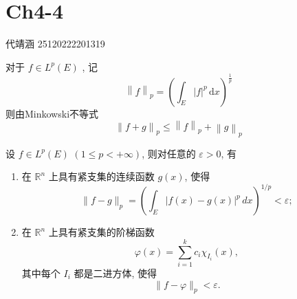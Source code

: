 \documentclass[../main.tex]{subfiles}
\begin{document}
\ifSubfilesClassLoaded{

    
    \setcounter{chapter}{3}
}{}

\chapter{ Ch4-4 }
代靖涵 25120222201319

\begin{definition}{}{}
对于 \(  f \in L^{p}\left( E \right)   \) , 记 \[
\left\| f \right\|_{p}= \left( \int_{E}\left| f \right|  ^{p}\,\mathrm{d} x\right)^{\frac{1}{p}} 
\]则由Minkowski不等式 \[
\left\| f+ g \right\|_{p}\le \left\| f \right\|_{p}+ \left\| g \right\|_{p}
\]
\end{definition}
\begin{lemma}{}{}
设 $f \in L^{p}(E)$ $(1 \le p < +\infty)$, 则对任意的 $\varepsilon > 0$, 有
\begin{enumerate}
\item 在 $\mathbb{R}^{n}$ 上具有紧支集的连续函数 $g(x)$, 使得
\[
\lVert f - g \rVert_{p} = \left( \int_{E} \lvert f(x) - g(x) \rvert^{p} \, dx \right)^{1/p} < \varepsilon ;
\]
\item 在 $\mathbb{R}^{n}$ 上具有紧支集的阶梯函数
\[
\varphi(x) = \sum_{i=1}^{k} c_{i} \chi_{I_{i}}(x) ,
\]
其中每个 $I_{i}$ 都是二进方体, 使得
\[
\lVert f - \varphi \rVert_{p} < \varepsilon .
\]
\end{enumerate}
\end{lemma}
\end{document}
